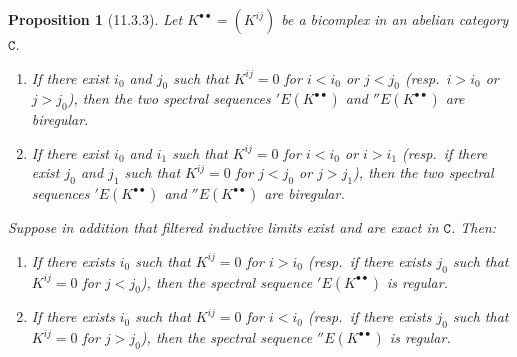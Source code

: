 \documentclass[oneside]{amsart}
\theoremstyle{ega-env-style}
\theoremstyle{ega-thm-env-style}
\newtheorem*{proposition}{Proposition}
\theoremstyle{ega-defn-env-style}
\def\cat{\mathtt}                   %
\let\EGAOriginalLabel\label
\renewcommand{\label}[1]{\phantomsection\EGAOriginalLabel{#1}}
\begin{document}
\begin{proposition}[11.3.3]
\label{0.11.3.3}
Let $K^{\bullet\bullet}=(K^{ij})$ be a bicomplex in an abelian category $\cat{C}$.
\begin{enumerate}
  \item[{\rm(i)}] If there exist $i_0$ and $j_0$ such that $K^{ij}=0$ for $i<i_0$ or $j<j_0$ (resp.~$i>i_0$ or $j>j_0$), then the two spectral sequences $'E(K^{\bullet\bullet})$ and $''E(K^{\bullet\bullet})$ are biregular.
  \item[{\rm(ii)}] If there exist $i_0$ and $i_1$ such that $K^{ij}=0$ for $i<i_0$ or $i>i_1$ (resp.~if there exist $j_0$ and $j_1$ such that $K^{ij}=0$ for $j<j_0$ or $j>j_1$), then the two spectral sequences $'E(K^{\bullet\bullet})$ and $''E(K^{\bullet\bullet})$ are biregular.
\end{enumerate}
Suppose in addition that filtered inductive limits exist and are exact in $\cat{C}$. Then:
\begin{enumerate}
  \item[{\rm(iii)}] If there exists $i_0$ such that $K^{ij}=0$ for $i>i_0$ (resp.~if there exists $j_0$ such that $K^{ij}=0$ for $j<j_0$), then the spectral sequence $'E(K^{\bullet\bullet})$ is regular.
  \item[{\rm(iv)}] If there exists $i_0$ such that $K^{ij}=0$ for $i<i_0$ (resp.~if there exists $j_0$ such that $K^{ij}=0$ for $j>j_0$), then the spectral sequence $''E(K^{\bullet\bullet})$ is regular.
\end{enumerate}
\end{proposition}
\end{document}
